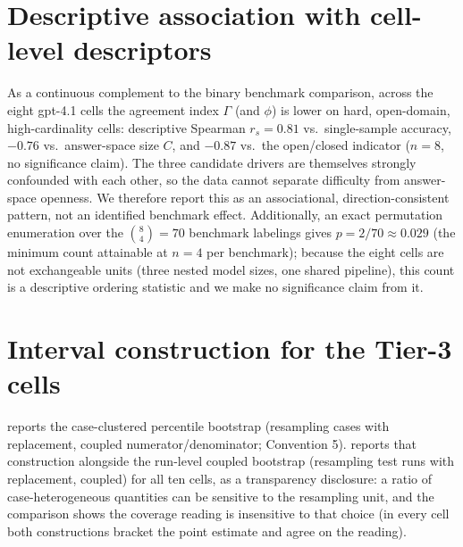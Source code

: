 \documentclass{article}
\newcommand{\agreementIndex}{\Gamma}
\begin{document}
\section{Descriptive association with cell-level descriptors}
\label{app:assoc}
As a continuous complement to the binary benchmark comparison, across the eight gpt-4.1 cells the agreement index $\agreementIndex$ (and $\phi$) is lower on hard, open-domain, high-cardinality cells: descriptive Spearman $r_s=0.81$ vs.\ single-sample accuracy, $-0.76$ vs.\ answer-space size $C$, and $-0.87$ vs.\ the open/closed indicator ($n=8$, no significance claim). The three candidate drivers are themselves strongly confounded with each other, so the data cannot separate difficulty from answer-space openness. We therefore report this as an associational, direction-consistent pattern, not an identified benchmark effect. Additionally, an exact permutation enumeration over the $\binom{8}{4}=70$ benchmark labelings gives $p=2/70\approx0.029$ (the minimum count attainable at $n=4$ per benchmark); because the eight cells are not exchangeable units (three nested model sizes, one shared pipeline), this count is a descriptive ordering statistic and we make no significance claim from it.

\section{Interval construction for the Tier-3 cells}
\label{app:ci}

 reports the case-clustered percentile bootstrap
(resampling cases with replacement, coupled numerator/denominator;
Convention 5).  reports that construction alongside the
run-level coupled bootstrap (resampling test runs with replacement,
coupled) for all ten cells, as a transparency disclosure: a ratio of
case-heterogeneous quantities can be sensitive to the resampling unit,
and the comparison shows the coverage reading is insensitive to that
choice (in every cell both constructions bracket the point estimate and
agree on the reading).
\end{document}
